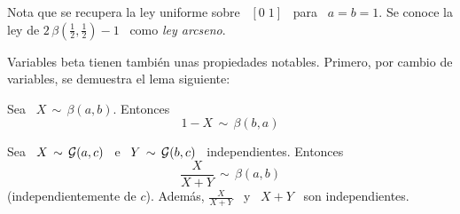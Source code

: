 Nota que se recupera la  ley uniforme sobre \ $[0 \; 1]$ \  para \ $a = b =
1$. Se conoce la ley de $ 2 \, \beta\left( \frac12 , \frac12 \right) - 1$ \ como
{\em ley arcseno}.

Variables beta  tienen tambi\'en unas propiedades notables.  Primero, por cambio
de variables, se demuestra el lema siguiente:
%
\begin{lema}[Reflexividad]
\label{Lem:MP:ReflexividadBeta}
%
  Sea \ $X \, \sim \, \beta(a,b)$. Entonces
  \[
  1-X \, \sim \, \beta(b,a)
  \]
\end{lema}
%
\begin{lema}
\label{Lem:MP:VinculoBetaGamma}
%
  Sea  \   $X  \,  \sim  \,   \mathcal{G}(a,c)$  \  e  \   $Y  \,  \sim   \,  \mathcal{G}(b,c)$  \
  independientes. Entonces
  \[
  \frac{X}{X+Y} \, \sim \, \beta(a,b)
  \]
  (independientemente  de $c$).   Adem\'as, $\frac{X}{X+Y}$  \ y  \ $X+Y$  \ son
  independientes.
\end{lema}
%
